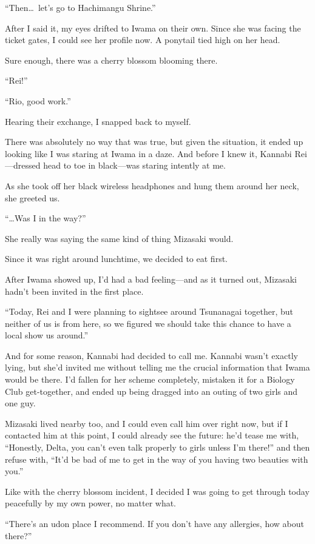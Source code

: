 \documentclass[
    a4paper,
    12pt,
    twoside,
    openany,
    UTF8,
    fontset=windows
]{ctexbook}
\begin{document}
``Then\dots\ let's go to Hachimangu Shrine.''

After I said it, my eyes drifted to Iwama on their own. Since she was facing the ticket gates, I could see her profile now. A ponytail tied high on her head.

Sure enough, there was a cherry blossom blooming there.

``Rei!''

``Rio, good work.''

Hearing their exchange, I snapped back to myself.

There was absolutely no way that was true, but given the situation, it ended up looking like I was staring at Iwama in a daze. And before I knew it, Kannabi Rei---dressed head to toe in black---was staring intently at me.

As she took off her black wireless headphones and hung them around her neck, she greeted us.

``\dots Was I in the way?''

She really was saying the same kind of thing Mizasaki would.

Since it was right around lunchtime, we decided to eat first.

After Iwama showed up, I'd had a bad feeling---and as it turned out, Mizasaki hadn't been invited in the first place.

``Today, Rei and I were planning to sightsee around Tsunanagai together, but neither of us is from here, so we figured we should take this chance to have a local show us around.''

And for some reason, Kannabi had decided to call me. Kannabi wasn't exactly lying, but she'd invited me without telling me the crucial information that Iwama would be there. I'd fallen for her scheme completely, mistaken it for a Biology Club get-together, and ended up being dragged into an outing of two girls and one guy.

Mizasaki lived nearby too, and I could even call him over right now, but if I contacted him at this point, I could already see the future: he'd tease me with, ``Honestly, Delta, you can't even talk properly to girls unless I'm there!'' and then refuse with, ``It'd be bad of me to get in the way of you having two beauties with you.''

Like with the cherry blossom incident, I decided I was going to get through today peacefully by my own power, no matter what.

``There's an udon place I recommend. If you don't have any allergies, how about there?''
\end{document}
